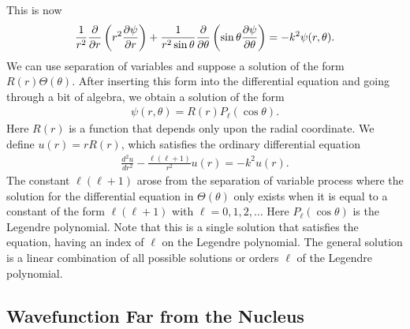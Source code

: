 This is now
\begin{align}
  \frac{1}{r^2} \frac{ \partial {} }{ \partial {r} } \left( r^2 \frac{ \partial {\psi} }{ \partial {r} } \right) + \frac{1}{r^2 \sin\theta } \frac{ \partial {} }{ \partial {\theta} } \left( \sin\theta \frac{ \partial {\psi} }{ \partial {\theta} } \right) = -k^2 \psi(r,\theta) .
\end{align}
We can use separation of variables and suppose a solution of the form $R(r) \Theta(\theta)$. After inserting this form into the differential equation and going through a bit of algebra, we obtain a solution of the form
\begin{align}
  \psi(r,\theta) = R(r) P_\ell(\cos\theta).
\end{align}
Here $R(r)$ is a function that depends only upon the radial coordinate. We define $u(r) = r R(r)$, which satisfies the ordinary differential equation
\begin{align} \label{Eq:nuclearData_schrodingerRadial}
  \frac{d^2 u}{dr^2} - \frac{\ell(\ell+1)}{r^2} u(r) = -k^2 u(r) .
\end{align}
The constant $\ell(\ell+1)$ arose from the separation of variable process where the solution for the differential equation in $\Theta(\theta)$ only exists when it is equal to a constant of the form $\ell(\ell+1)$ with $\ell = 0, 1, 2, \ldots$ Here $P_\ell(\cos\theta)$ is the Legendre polynomial. Note that this is a single solution that satisfies the equation, having an index of $\ell$ on the Legendre polynomial. The general solution is a linear combination of all possible solutions or orders $\ell$ of the Legendre polynomial.

\subsection{Wavefunction Far from the Nucleus}

